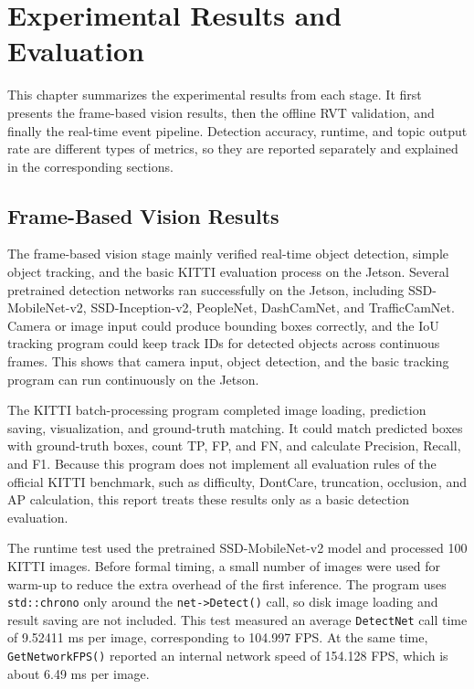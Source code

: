 \chapter{Experimental Results and Evaluation}

This chapter summarizes the experimental results from each stage. It first presents the frame-based vision results, then the offline RVT validation, and finally the real-time event pipeline. Detection accuracy, runtime, and topic output rate are different types of metrics, so they are reported separately and explained in the corresponding sections.

\section{Frame-Based Vision Results}

The frame-based vision stage mainly verified real-time object detection, simple object tracking, and the basic KITTI evaluation process on the Jetson. Several pretrained detection networks ran successfully on the Jetson, including SSD-MobileNet-v2, SSD-Inception-v2, PeopleNet, DashCamNet, and TrafficCamNet. Camera or image input could produce bounding boxes correctly, and the IoU tracking program could keep track IDs for detected objects across continuous frames. This shows that camera input, object detection, and the basic tracking program can run continuously on the Jetson.

The KITTI batch-processing program completed image loading, prediction saving, visualization, and ground-truth matching. It could match predicted boxes with ground-truth boxes, count TP, FP, and FN, and calculate Precision, Recall, and F1. Because this program does not implement all evaluation rules of the official KITTI benchmark, such as difficulty, DontCare, truncation, occlusion, and AP calculation, this report treats these results only as a basic detection evaluation.

The runtime test used the pretrained SSD-MobileNet-v2 model and processed 100 KITTI images. Before formal timing, a small number of images were used for warm-up to reduce the extra overhead of the first inference. The program uses \texttt{std::chrono} only around the \texttt{net->Detect()} call, so disk image loading and result saving are not included. This test measured an average \texttt{DetectNet} call time of 9.52411 ms per image, corresponding to 104.997 FPS. At the same time, \texttt{GetNetworkFPS()} reported an internal network speed of 154.128 FPS, which is about 6.49 ms per image.

